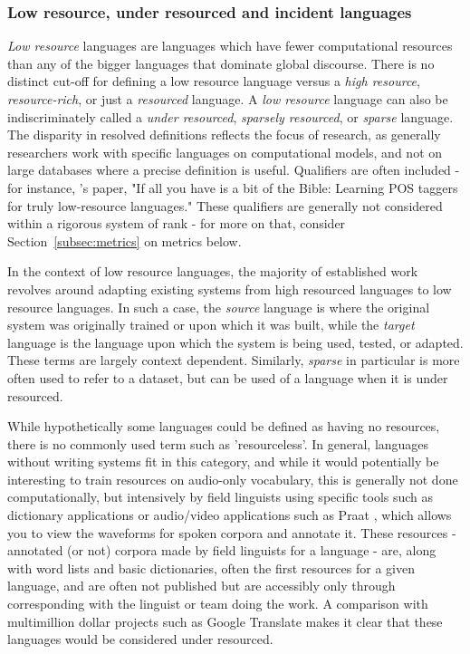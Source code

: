 \subsubsection{Low resource, under resourced and incident languages}

\textit{Low resource} languages are languages which have fewer computational resources than any of the bigger languages that dominate global discourse. There is no distinct cut-off for defining a low resource language versus a \textit{high resource}, \textit{resource-rich}, or just a \textit{resourced} language. A \textit{low resource} language can also be indiscriminately called a \textit{under resourced}, \textit{sparsely resourced}, or \textit{sparse} language. The disparity in resolved definitions reflects the focus of research, as generally researchers work with specific languages on computational models, and not on large databases where a precise definition is useful. Qualifiers are often included - for instance, \citet{agic2015if}'s paper, "If all you have is a bit of the Bible: Learning POS taggers for truly low-resource languages." These qualifiers are generally not considered within a rigorous system of rank - for more on that, consider Section~\ref{subsec:metrics} on metrics below.

In the context of low resource languages, the majority of established work revolves around adapting existing systems from high resourced languages to low resource languages. In such a case, the \textit{source} language is where the original system was originally trained or upon which it was built, while the \textit{target} language is the language upon which the system is being used, tested, or adapted. These terms are largely context dependent. Similarly, \textit{sparse} in particular is more often used to refer to a dataset, but can be used of a language when it is under resourced.

While hypothetically some languages could be defined as having no resources, there is no commonly used term such as 'resourceless'. In general, languages without writing systems fit in this category, and while it would potentially be interesting to train resources on audio-only vocabulary, this is generally not done computationally, but intensively by field linguists using specific tools such as dictionary applications or audio/video applications such as Praat \citep{boersma2009praat}, which allows you to view the waveforms for spoken corpora and annotate it. These resources - annotated (or not) corpora made by field linguists for a language - are, along with word lists and basic dictionaries, often the first resources for a given language, and are often not published but are accessibly only through corresponding with the linguist or team doing the work. A comparison with multimillion dollar projects such as Google Translate makes it clear that these languages would be considered under resourced.

